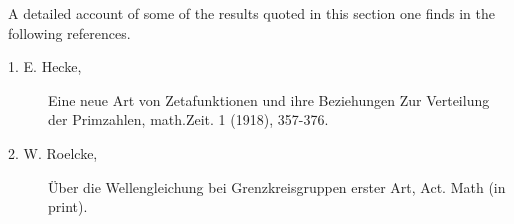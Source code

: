 A detailed account of some of the results quoted in this section one
finds in the following references. 
\begin{description}
\item[1. E. Hecke,] Eine neue Art von Zetafunktionen und ihre
  Beziehungen Zur Verteilung der Primzahlen, math.Zeit. 1 (1918),
  357-376. 

\item[2. W. Roelcke,] \"Uber die Wellengleichung bei
  Grenzkreisgruppen erster Art, Act. Math (in print). 
\end{description}

